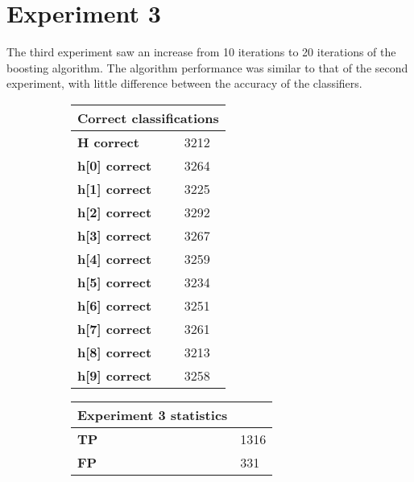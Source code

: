 \documentclass[titlepage,11pt]{article}
\begin{document}
\section[6]{Experiment 3} {

\vspace{2pt} \hspace{2pt}The third experiment saw an increase from 10 iterations to 20 iterations of the boosting algorithm. The algorithm performance was similar to that of the second experiment, with little difference between the accuracy of the classifiers.\\
\vspace{0.5pt}
\begin{figure}[h]
\centering
    \begin{subfigure}[h]{0.3\textwidth}
    \centering
        \begin{tabular}{|l|l|}
        \hline
        \multicolumn{2}{|c|}{\textbf{Correct classifications}}\\
        \hline
        \textbf{ H correct } & 3212 \\
        \textbf{ h[0] correct } & 3264 \\
        \textbf{ h[1] correct } & 3225 \\
        \textbf{ h[2] correct } & 3292 \\
        \textbf{ h[3] correct } & 3267 \\
        \textbf{ h[4] correct } & 3259 \\
        \textbf{ h[5] correct } & 3234 \\
        \textbf{ h[6] correct } & 3251 \\
        \textbf{ h[7] correct } & 3261 \\
        \textbf{ h[8] correct } & 3213 \\
        \textbf{ h[9] correct } & 3258 \\
        \hline
        \end{tabular}
    \end{subfigure}
    \begin{subfigure}[h]{0.3\textwidth}
    \centering
        \hspace{5pt}
        \vspace{2pt}
        \begin{tabular}{|l|l|}
        \hline
        \textbf{Experiment 3 statistics} & \\
        \hline
        \textbf{ TP } & 1316 \\
        \textbf{ FP } & 331 \\

\end{tabular}
\end{subfigure}
\end{figure}}
\end{document}

